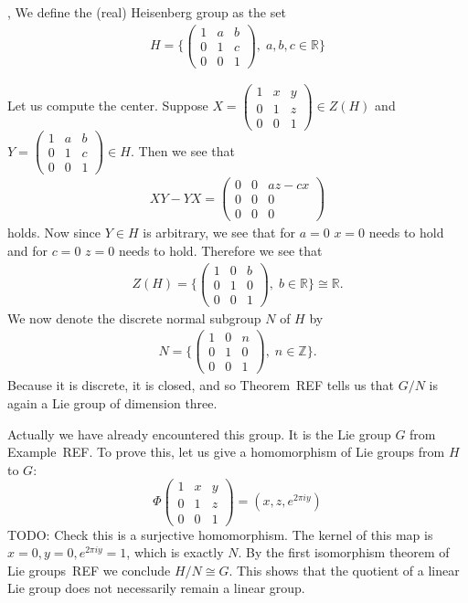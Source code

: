 \begin{definition}
\textup{\cite[10.2]{Fulton2004}, \cite[4.8]{Hall2015}}
We define the (real) Heisenberg group as the set
\begin{align*}
H = \Bigg\{\begin{pmatrix}
1 &a &b\\
0 &1 &c\\
0 &0 &1
\end{pmatrix}, \; a,b,c \in \mathbb{R} \Bigg\}
\end{align*} 
\end{definition}
Let us compute the center.
Suppose $X = \begin{pmatrix}
1 &x &y\\
0 &1 &z\\
0 &0 &1
\end{pmatrix} \in Z(H)$ and $Y= \begin{pmatrix}
1 &a &b\\
0 &1 &c\\
0 &0 &1
\end{pmatrix} \in H$. Then we see that 
\begin{align*}
XY - YX = \begin{pmatrix}
0 &0 &az-cx\\
0 &0 &0\\
0 &0 &0
\end{pmatrix}
\end{align*} holds. Now since $Y \in H$ is arbitrary, we see that for $a=0$ $x=0$ needs to hold and for $c=0$ $z=0$ needs to hold. Therefore we see that 
\begin{align*}
Z(H) = \Bigg\{\begin{pmatrix}
1 &0 &b\\
0 &1 &0\\
0 &0 &1
\end{pmatrix}, \; b \in \mathbb{R}\Bigg\} \cong \mathbb{R}.
\end{align*}
We now denote the discrete normal subgroup $N$ of $H$ by 
\begin{align*}
N = \Bigg\{\begin{pmatrix}
1 &0 &n\\
0 &1 &0\\
0 &0 &1
\end{pmatrix}, \; n \in \mathbb{Z}\Bigg\}.
\end{align*}
Because it is discrete, it is closed, and so Theorem~REF tells us that $G/N$ is again a Lie group of dimension three.

Actually we have already encountered this group.
It is the Lie group $G$ from Example~REF.
To prove this, let us give a homomorphism of Lie groups from $H$ to $G$:
\[
\Phi\begin{pmatrix}
1 &x &y\\
0 &1 &z\\
0 &0 &1
\end{pmatrix}
= (x,z,e^{2\pi i y})
\]
TODO: Check this is a surjective homomorphism.
The kernel of this map is $x = 0,y=0, e^{2\pi i y} = 1$, which is exactly $N$.
By the first isomorphism theorem of Lie groups~REF we conclude $H/N \cong G$.
This shows that the quotient of a linear Lie group does not necessarily remain a linear group.




